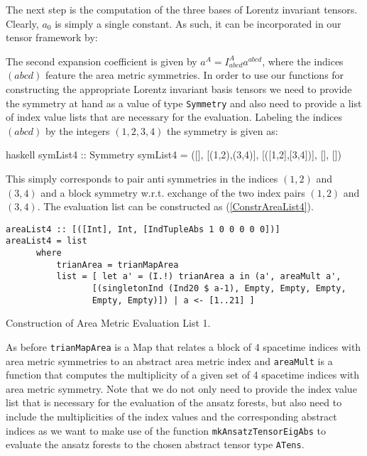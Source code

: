 The next step is the computation of the three bases of Lorentz invariant tensors. Clearly, $a_0$ is simply a single constant. As such, it can be incorporated in our tensor framework by:
\begin{center}
\end{center}
The second expansion coefficient is given by $a^A = I^A_{abcd} a^{abcd}$, where the indices $(abcd)$ feature the area metric symmetries. In order to use our functions for constructing the appropriate Lorentz invariant basis tensors we need to provide the symmetry at hand as a value of type \texttt{Symmetry} and also need to provide a list of index value lists that are necessary for the evaluation. Labeling the indices $(abcd)$ by the integers $(1,2,3,4)$ the symmetry is given as:
\begin{center}
\begin{cminted}{haskell}
symList4 :: Symmetry
symList4 = ([], [(1,2),(3,4)], [([1,2],[3,4])], [], [])
\end{cminted}
\end{center}
This simply corresponds to pair anti symmetries in the indices $(1,2)$ and $(3,4)$ and a block symmetry w.r.t. exchange of the two index pairs $(1,2)$ and $(3,4)$. The evaluation list can be constructed as (\ref{ConstrAreaList4}).
\begin{listing}[hbt!]
\begin{verbatim}
areaList4 :: [([Int], Int, [IndTupleAbs 1 0 0 0 0 0])]
areaList4 = list
      where
          trianArea = trianMapArea
          list = [ let a' = (I.!) trianArea a in (a', areaMult a',
                 [(singletonInd (Ind20 $ a-1), Empty, Empty, Empty,
                 Empty, Empty)]) | a <- [1..21] ]
\end{verbatim} 
\caption{Construction of Area Metric Evaluation List 1.}\label{ConstrAreaList4}
\end{listing}
As before \texttt{trianMapArea} is a Map that relates a block of 4 spacetime indices with area metric symmetries to an abstract area metric index and \texttt{areaMult} is a function that computes the multiplicity of a given set of 4 spacetime indices with area metric symmetry. Note that we do not only need to provide the index value list that is necessary for the evaluation of the ansatz forests, but also need to include the multiplicities of the index values and the corresponding abstract indices as we want to make use of the function \texttt{mkAnsatzTensorEigAbs} to evaluate the ansatz forests to the chosen abstract tensor type \texttt{ATens}. 

